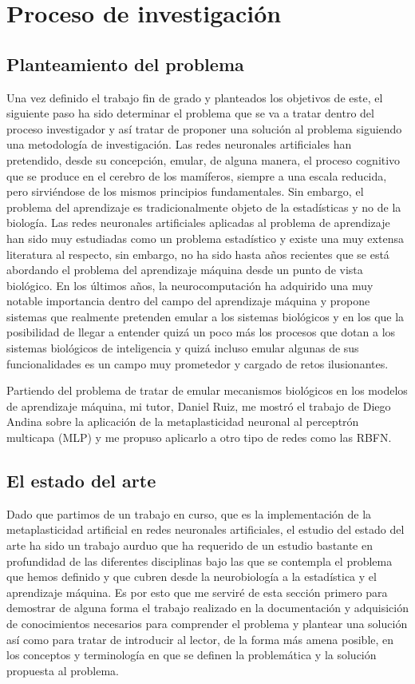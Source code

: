 \documentclass[10pt,a4paper]{report}
\begin{document}
\chapter{Proceso de investigación}
\section{Planteamiento del problema}
Una vez definido el trabajo fin de grado y planteados los objetivos de este, el siguiente paso ha sido determinar el problema que se va a tratar dentro del proceso investigador y así tratar de proponer una solución al problema siguiendo una metodología de investigación.
Las redes neuronales artificiales han pretendido, desde su concepción, emular, de alguna manera, el proceso cognitivo que se produce en el cerebro de los mamíferos, siempre a una escala reducida, pero sirviéndose de los mismos principios fundamentales. Sin embargo, el problema del aprendizaje es tradicionalmente objeto de la estadísticas y no de la biología. Las redes neuronales artificiales aplicadas al problema de aprendizaje han sido muy estudiadas como un problema estadístico y existe una muy extensa literatura al respecto, sin embargo, no ha sido hasta años recientes que se está abordando el problema del aprendizaje máquina desde un punto de vista biológico. En los últimos años, la neurocomputación ha adquirido una muy notable importancia dentro del campo del aprendizaje máquina y propone sistemas que realmente pretenden emular a los sistemas biológicos y en los que la posibilidad de llegar a entender quizá un poco más los procesos que dotan a los sistemas biológicos de inteligencia y quizá incluso emular algunas de sus funcionalidades es un campo muy prometedor y cargado de retos ilusionantes.

Partiendo del problema de tratar de emular mecanismos biológicos en los modelos de aprendizaje máquina, mi tutor, Daniel Ruiz, me mostró el trabajo de Diego Andina\citep{Andina2009} sobre la aplicación de la metaplasticidad neuronal al perceptrón multicapa (MLP) y me propuso aplicarlo a otro tipo de redes como las RBFN.

\section{El estado del arte}
Dado que partimos de un trabajo en curso, que es la implementación de la metaplasticidad artificial en redes neuronales artificiales, el estudio del estado del arte ha sido un trabajo aurduo que ha requerido de un estudio bastante en profundidad de las diferentes disciplinas bajo las que se contempla el problema que hemos definido y que cubren desde la neurobiología a la estadística y el aprendizaje máquina. Es por esto que me serviré de esta sección primero para demostrar de alguna forma el trabajo realizado en la documentación y adquisición de conocimientos necesarios para comprender el problema y plantear una solución así como para tratar de introducir al lector, de la forma más amena posible, en los conceptos y terminología en que se definen la problemática y la solución propuesta al problema.
\end{document}
